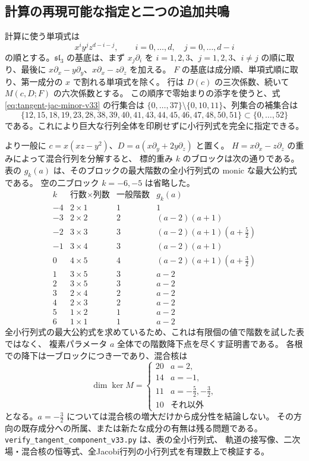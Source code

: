 \subsection{計算の再現可能な指定と二つの追加共鳴}

計算に使う単項式は
\[
 x^iy^jz^{d-i-j},\qquad i=0,\ldots,d,\quad j=0,\ldots,d-i
\]
の順とする。$\mathfrak{sl}_3$ の基底は、まず $x_j\partial_i$ を
$i=1,2,3$、$j=1,2,3$、$i\ne j$ の順に取り、最後に
$x\partial_x-y\partial_y$、$x\partial_x-z\partial_z$ を加える。
$F$ の基底は成分順、単項式順に取り、第一成分の $x$ で割れる単項式を除く。
行は $D(c)$ の三次係数、続いて $M(c,D;F)$ の六次係数とする。
この順序で零始まりの添字を使うと、式 \eqref{eq:tangent-jac-minor-v33} の行集合は
$\{0,\ldots,37\}\setminus\{0,10,11\}$、列集合の補集合は
\[
 \{12,15,18,19,23,28,38,39,40,41,43,44,45,46,47,48,50,51\}
 \subset\{0,\ldots,52\}
\]
である。これにより巨大な行列全体を印刷せずに小行列式を完全に指定できる。

より一般に $c=x(xz-y^2)$、$D=a(x\partial_y+2y\partial_z)$ と置く。
$H=x\partial_x-z\partial_z$ の重みによって混合行列を分解すると、
標的重み $k$ のブロックは次の通りである。
表の $g_k(a)$ は、そのブロックの最大階数の全小行列式の monic な最大公約式である。
空の二ブロック $k=-6,-5$ は省略した。
\[
\begin{array}{c|c|c|l}
 k&\text{行数}\times\text{列数}&\text{一般階数}&g_k(a)\\\hline
 -4&2\times1&1&1\\
 -3&2\times2&2&(a-2)(a+1)\\
 -2&3\times3&3&(a-2)(a+1)(a+\tfrac52)\\
 -1&3\times4&3&(a-2)(a+1)\\
 0&4\times5&4&(a-2)(a+1)(a+\tfrac32)\\
 1&3\times5&3&a-2\\
 2&3\times5&3&a-2\\
 3&2\times4&2&a-2\\
 4&2\times3&2&a-2\\
 5&1\times2&1&a-2\\
 6&1\times1&1&a-2
\end{array}
\]
全小行列式の最大公約式を求めているため、これは有限個の値で階数を試した表ではなく、
複素パラメータ $a$ 全体での階数降下点を尽くす証明書である。
各根での降下は一ブロックにつき一であり、混合核は
\[
 \dim\ker M=
 \begin{cases}
 20&a=2,\\
 14&a=-1,\\
 11&a=-\tfrac52,-\tfrac32,\\
 10&\text{それ以外}
 \end{cases}
\]
となる。$a=-\tfrac32$ については混合核の増大だけから成分性を結論しない。
その方向の既存成分への所属、または新たな成分の有無は残る問題である。
\texttt{verify\_tangent\_component\_v33.py} は、表の全小行列式、
軌道の接写像、二次場・混合核の恒等式、全Jacobi行列の小行列式を有理数上で検証する。
